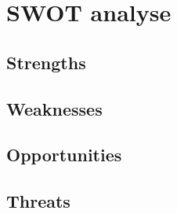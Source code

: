 \section{SWOT analyse}
\subsection{Strengths}
\subsection{Weaknesses}
\subsection{Opportunities}
\subsection{Threats}



